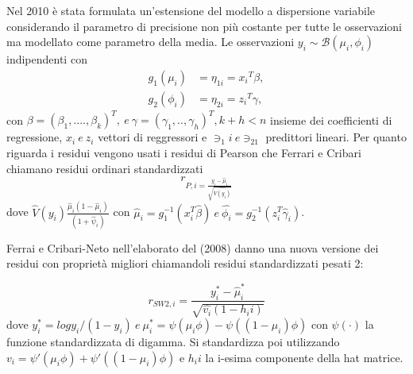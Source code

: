 \documentclass[twoside,twocolumn]{article}
\begin{document}
Nel 2010 è stata formulata un'estensione del modello a dispersione variabile considerando il parametro di precisione non più costante per tutte le osservazioni ma modellato come parametro della media. Le osservazioni $y_i \sim \mathbb{\mathcal{B}}(\mu_i, \phi_i)$ indipendenti con 
\begin{align}
g_1(\mu_i)&=\eta_{1i}=x{_i}^T \beta, \label{eq:mean}\\
g_2(\phi_i)&=\eta_{2i}=z{_i}^T \gamma, \label{eq:precisione}
\end{align}
con $\beta=(\beta_1,....,\beta_k)^T , \  e \ \gamma=(\gamma_1,..,\gamma_h)^T , k+h<n$ insieme dei coefficienti di regressione, $x_i \ e \ z_i$ vettori di reggressori e $\ni_1i \ e \ni_21 $ predittori lineari. Per quanto riguarda i residui vengono usati i residui di Pearson che Ferrari e Cribari chiamano residui ordinari standardizzati
$$r_{P,i=\frac{y_i-\hat{\mu}_i}{\sqrt{\hat{V(y_i)}}}}$$  dove $\hat{V}(y_i)\frac{\hat{\mu}_i(1-\hat{\mu}_i)}{(1+\hat{\psi}_i)}$ con $\hat{\mu}_i=g_1 ^{-1}(x_i ^T \hat{\beta}) \ e \ \hat{\phi_i}=g_2^{-1}(z_i ^T \hat{\gamma}_i)$.

Ferrai e Cribari-Neto nell'elaborato del (2008) danno una nuova versione dei residui con proprietà migliori chiamandoli residui standardizzati pesati 2:

$$r_{SW2,i}=\frac{y_i ^* - \hat{\mu}_i ^*}{\sqrt{\hat{v_i}(1-h_ii)}}$$
dove $y_i ^* = log{y_i/(1-y_i)} \ e \ \mu _i ^* = \psi (\mu_i \phi)-\psi ((1-\mu_i)\phi)$ con $\psi (\cdot)$ la funzione standardizzata di digamma. Si standardizza poi utilizzando $v_i= {\psi ' (\mu_i\phi)+\psi '((1-\mu_i)\phi)}$ e $h_ii$ la i-esima componente della hat matrice.\cite{RESIDUAL}
\end{document}
